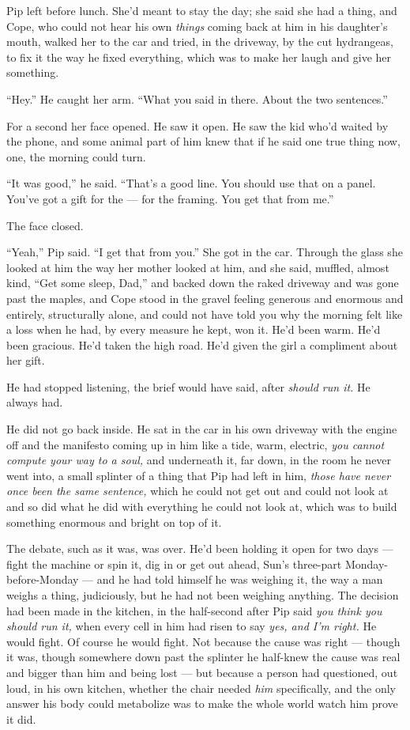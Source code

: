 \documentclass[11pt,openany]{book}
\newcommand{\scenebreak}{\par\vspace{0.5\baselineskip}\begin{center}\textasteriskcentered\quad\textasteriskcentered\quad\textasteriskcentered\end{center}\vspace{0.5\baselineskip}\par}
\begin{document}
\scenebreak


Pip left before lunch. She'd meant to stay the day; she said she had a thing, and Cope, who could not hear his own \textit{things} coming back at him in his daughter's mouth, walked her to the car and tried, in the driveway, by the cut hydrangeas, to fix it the way he fixed everything, which was to make her laugh and give her something.

``Hey.'' He caught her arm. ``What you said in there. About the two sentences.''

For a second her face opened. He saw it open. He saw the kid who'd waited by the phone, and some animal part of him knew that if he said one true thing now, one, the morning could turn.

``It was good,'' he said. ``That's a good line. You should use that on a panel. You've got a gift for the --- for the framing. You get that from me.''

The face closed.

``Yeah,'' Pip said. ``I get that from you.'' She got in the car. Through the glass she looked at him the way her mother looked at him, and she said, muffled, almost kind, ``Get some sleep, Dad,'' and backed down the raked driveway and was gone past the maples, and Cope stood in the gravel feeling generous and enormous and entirely, structurally alone, and could not have told you why the morning felt like a loss when he had, by every measure he kept, won it. He'd been warm. He'd been gracious. He'd taken the high road. He'd given the girl a compliment about her gift.

He had stopped listening, the brief would have said, after \textit{should run it.} He always had.


\scenebreak


He did not go back inside. He sat in the car in his own driveway with the engine off and the manifesto coming up in him like a tide, warm, electric, \textit{you cannot compute your way to a soul,} and underneath it, far down, in the room he never went into, a small splinter of a thing that Pip had left in him, \textit{those have never once been the same sentence,} which he could not get out and could not look at and so did what he did with everything he could not look at, which was to build something enormous and bright on top of it.

The debate, such as it was, was over. He'd been holding it open for two days --- fight the machine or spin it, dig in or get out ahead, Sun's three-part Monday-before-Monday --- and he had told himself he was weighing it, the way a man weighs a thing, judiciously, but he had not been weighing anything. The decision had been made in the kitchen, in the half-second after Pip said \textit{you think you should run it,} when every cell in him had risen to say \textit{yes, and I'm right.} He would fight. Of course he would fight. Not because the cause was right --- though it was, though somewhere down past the splinter he half-knew the cause was real and bigger than him and being lost --- but because a person had questioned, out loud, in his own kitchen, whether the chair needed \textit{him} specifically, and the only answer his body could metabolize was to make the whole world watch him prove it did.
\end{document}
